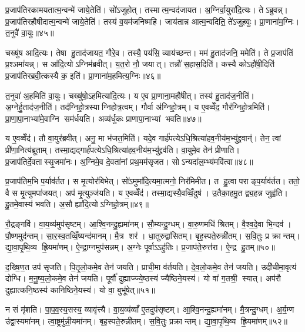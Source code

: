 प्र॒जाप॑तिरकामयतात्म॒न्वन्मे॑ जाये॒तेति॑। सो॑ऽजुहोत्। तस्मात्म॒न्वद॑जायत। अ॒ग्निर्वा॒युरा॑दि॒त्यः। तेऽब्रुवन्न्। प्र॒जाप॑तिरहौषीदात्म॒न्वन्मे॑ जाये॒तेति॑। तस्य॑ व॒यम॑जनिष्महि। जाय॑तान्न आत्म॒न्वदिति॒ ते॑ऽजुहवुः। प्रा॒णाना॑म॒ग्निः। त॒नुवै॑ वा॒युः॥४५॥

चख्षु॑ष आदि॒त्यः। तेषा हु॒ताद॑जायत॒ गौरे॒व। तस्यै॒ पय॑सि॒ व्याय॑च्छन्त। मम॑ हु॒ताद॑जनि॒ ममेति॑। ते प्र॒जाप॑तिं प्र॒श्ञमा॑यन्न्। स आ॑दि॒त्योऽग्निम॑ब्रवीत्। य॒त॒रो नौ॒ जयात्। तन्नौ॑ स॒हास॒दिति॑। कस्यै कोऽहौ॑षी॒दिति॑ प्र॒जाप॑तिरब्रवी॒त्कस्यै क॒ इति॑। प्रा॒णाना॑म॒हमित्य॒ग्निः॥४६॥

त॒नुवा॑ अ॒हमिति॑ वा॒युः। चख्षु॑षो॒ऽहमित्या॑दि॒त्यः। य ए॒व प्रा॒णाना॒महौ॑षीत्। तस्य॑ हु॒ताद॑ज॒नीति॑। अ॒ग्नेर्\mbox{}हु॒ताद॑ज॒नीति॑। तद॑ग्निहो॒त्रस्याग्निहोत्र॒त्वम्। गौर्वा अ॑ग्निहो॒त्रम्। य ए॒वव्वेँद॒ गौर॑ग्निहो॒त्रमिति॑। प्रा॒णा॒पा॒नाभ्या॑मे॒वाग्नि सम॑र्धयति। अव्य॑र्धुकः प्राणापा॒नाभ्यां भवति॥४७॥

य ए॒वव्वेँद॑। तौ वा॒युर॑ब्रवीत्। अनु॒ मा भ॑जत॒मिति॑। यदे॒व गार्\mbox{}ह॑पत्येऽधि॒श्रित्या॑हव॒नीय॑म॒भ्यु॑द्द्रवान्॑। तेन॒ त्वां प्री॑णा॒नित्य॑ब्रूताम्। तस्मा॒द्यद्गार्\mbox{}ह॑पत्येऽधि॒श्रित्या॑हव॒नीय॑म॒भ्यु॑द्द्रव॑ति। वा॒युमे॒व तेन॑ प्रीणाति। प्र॒जाप॑तिर्दे॒वतास्सृ॒जमा॑नः। अ॒ग्निमे॒व दे॒वता॑नां प्रथ॒मम॑सृजत। सोऽन्यदा॑ल॒म्भ्य॑मवि॑त्वा॥४८॥

प्र॒जाप॑तिम॒भि प॒र्याव॑र्तत। स मृ॒त्योर॑बिभेत्। सो॑ऽमुमा॑दि॒त्यमा॒त्मनो॒ निर॑मिमीत। त हु॒त्वा पराङ्प॒र्याव॑र्तत। ततो॒ वै स मृ॒त्युमपा॑जयत्। अप॑ मृ॒त्युञ्ज॑यति। य ए॒वव्वेँद॑। तस्मा॒द्यस्यै॒वव्विँ॒दुष॑। उ॒तैका॒हमु॒त द्व्य॒हन्न जुह्व॑ति। हु॒तमे॒वास्य॑ भवति। अ॒सौ ह्या॑दि॒त्योऽग्निहो॒त्रम्॥४९॥\anuvakamend[त॒नुवै॑ वा॒युर॒ग्निर्भ॑व॒त्यवि॑त्वा भव॒त्येक॑ञ्च]

रौ॒द्रङ्गवि॑। वा॒य॒व्य॑मुप॑सृष्टम्। आ॒श्वि॒नन्दु॒ह्यमा॑नम्। सौ॒म्यन्दु॒ग्धम्। वा॒रु॒णमधि॑ श्रितम्। वै॒श्व॒दे॒वा भि॒न्दव॑। पौ॒ष्णमुद॑न्तम्। सा॒र॒स्व॒तव्विँ॒ष्यन्द॑मानम्। मै॒त्र शर॑। धा॒तुरुद्वा॑सितम्। बृह॒स्पते॒रुन्नी॑तम्। स॒वि॒तुः प्र क्रान्तम्। द्या॒वा॒पृ॒थि॒व्य ह्रि॒यमा॑णम्। ऐ॒न्द्रा॒ग्नमुप॑सन्नम्। अ॒ग्नेः पूर्वाऽऽहु॑तिः। प्र॒जाप॑ते॒रुत्त॑रा। ऐ॒न्द्र हु॒तम्॥५०॥\anuvakamend[उद्वा॑सित स॒प्त च॑]

द॒ख्षि॒ण॒त उप॑ सृजति। पि॒तृ॒लो॒कमे॒व तेन॑ जयति। प्राची॒मा व॑र्तयति। दे॒व॒लो॒कमे॒व तेन॑ जयति। उदी॑चीमा॒वृत्य॑ दोग्धि। म॒नु॒ष्य॒लो॒कमे॒व तेन॑ जयति। पूर्वौ॑ दुह्याज्ज्ये॒ष्ठस्य॑ ज्यैष्ठिने॒यस्य॑। यो वा॑ ग॒तश्री॒ स्यात्। अप॑रौ दुह्यात्कनि॒ष्ठस्य॑ कानिष्ठिने॒यस्य॑। यो वा॒ बुभू॑षेत्॥५१॥

न सं मृ॑शति। पा॒प॒व॒स्य॒सस्य॒ व्यावृ॑त्त्यै। वा॒य॒व्य॑व्वाँ ए॒तदुप॑सृष्टम्। आ॒श्वि॒नन्दु॒ह्यमा॑नम्। मै॒त्रन्दु॒ग्धम्। अ॒र्य॒म्ण उ॑द्वा॒स्यमा॑नम्। त्वा॒ष्ट्रमु॑न्नी॒यमा॑नम्। बृह॒स्पते॒रुन्नी॑तम्। स॒वि॒तुः प्रक्रान्तम्। द्या॒वा॒पृ॒थि॒व्य ह्रि॒यमा॑णम्॥५२॥

